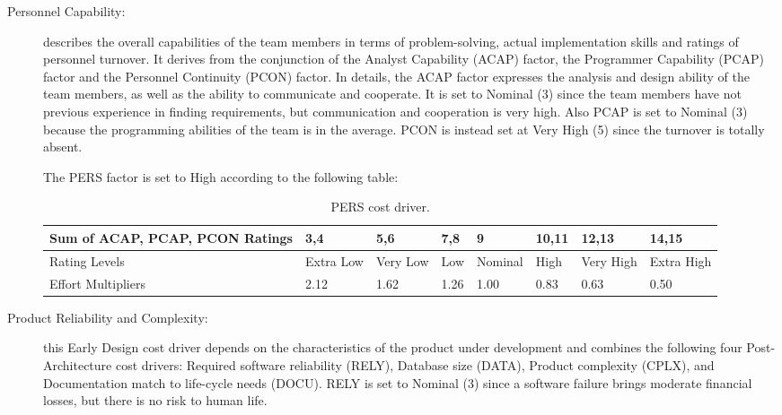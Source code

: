 \begin{description}
\item[Personnel Capability:] describes the overall capabilities of the team members in terms of problem-solving, actual implementation skills and ratings of personnel turnover. It derives from the conjunction of the Analyst Capability (ACAP) factor, the Programmer Capability (PCAP) factor and the Personnel Continuity (PCON) factor. In details, the ACAP factor expresses the analysis and design ability of the team members, as well as the ability to communicate and cooperate. It is set to Nominal (3) since the team members have not previous experience in finding requirements, but  communication and cooperation is very high. Also PCAP is set to Nominal (3) because the programming abilities of the team is in the average. PCON is instead set at Very High (5) since the turnover is totally absent.

The PERS factor is set to High according to the following table:

\begin{table}[H]
	\begin{adjustwidth}{-.5in}{-.5in}
    \centering
    \begin{tabular}{p{4cm}|p{1cm}|p{1cm}|p{1cm}|p{1.5cm}|p{1cm}|p{1cm}|p{1cm}}
        \hline
        Sum of ACAP, PCAP, PCON Ratings & 3,4 & 5,6 & 7,8 & 9 & 10,11 & 12,13 & 14,15 \\
        \hline
        \hline
        Rating Levels & Extra Low & Very Low & Low & Nominal & High & Very High & Extra High \\
        \hline
        Effort Multipliers & 2.12 & 1.62 & 1.26 & 1.00 & 0.83 & 0.63 & 0.50 \\
        \hline
    \end{tabular}
    \caption{PERS cost driver.}
    \end{adjustwidth}
\end{table}

\item[Product Reliability and Complexity:] this Early Design cost driver depends on the characteristics of the product under development and combines the following four Post-Architecture cost drivers: Required
software reliability (RELY), Database size (DATA), Product complexity (CPLX), and
Documentation match to life-cycle needs (DOCU).
RELY is set to Nominal (3) since a software failure brings moderate financial losses, but there is no risk to human life.


\end{description}
